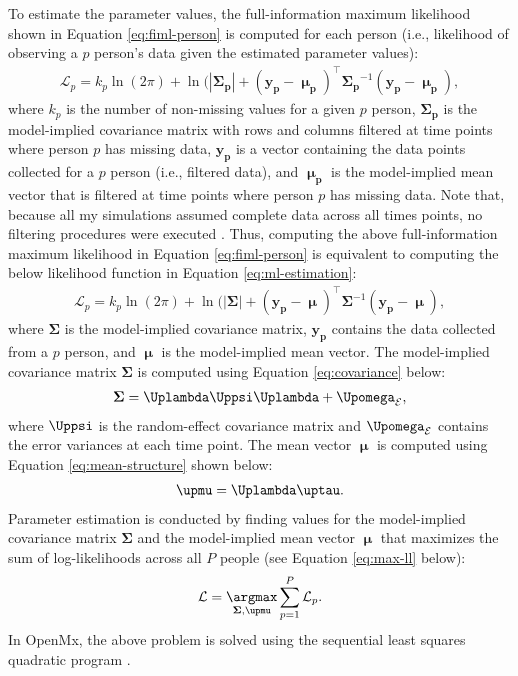 \documentclass[
12pt, %
twoside,
english]{guelphthesis}
\begin{document}
To estimate the parameter values, the full-information maximum
likelihood shown in Equation \ref{eq:fiml-person} is computed for each
person (i.e., likelihood of observing a \(p\) person's data given the
estimated parameter values):
\begin{align}
\mathcal{L}_p = k_p \ln(2\pi) + \ln(|\mathbf{\Sigma_p}| + (\mathbf{y_p} - \mathbf{\upmu_p})^\top \mathbf{\Sigma_p}^{-1}(\mathbf{y_p} - \mathbf{\upmu_p}),
\label{eq:fiml-person}
\end{align}
\noindent where \(k_p\) is the number of non-missing values for a given
\(p\) person, \(\mathbf{\Sigma_p}\) is the model-implied covariance matrix
with rows and columns filtered at time points where person \(p\) has
missing data, \(\mathbf{y_p}\) is a vector containing the data points collected for a \(p\) person (i.e., filtered data), and
\(\mathbf{\upmu_p}\) is the model-implied mean vector that is filtered at
time points where person \(p\) has missing data. Note that, because all
my simulations assumed complete data across all times points, no filtering
procedures were executed \autocite[for a review of the filtering procedure, see][Chapter 5]{boker2020}. Thus, computing the above full-information
maximum likelihood in Equation \ref{eq:fiml-person} is equivalent to
computing the below likelihood function in Equation
\ref{eq:ml-estimation}:
\begin{align}
\mathcal{L}_p = k_p \ln(2\pi) + \ln(|\mathbf{\Sigma}| + (\mathbf{y_p} - \mathbf{\upmu})^\top \mathbf{\Sigma}^{-1}(\mathbf{y_p} - \mathbf{\upmu}),  
\label{eq:ml-estimation}
\end{align}
\noindent where \(\mathbf{\Sigma}\) is the model-implied covariance matrix,
\(\mathbf{y_p}\) contains the data collected from a \(p\) person, and
\(\mathbf{\upmu}\) is the model-implied mean vector. The model-implied
covariance matrix \(\mathbf{\Sigma}\) is computed using Equation
\ref{eq:covariance} below:
\begin{align}
\mathbf{\Sigma} = \mathbf{\Uplambda\Uppsi\Uplambda} + \mathbf{\Upomega}_{\mathcal{E}},   
\label{eq:covariance}
\end{align}
\noindent where \(\mathbf{\Uppsi}\) is the random-effect covariance matrix
and \(\mathbf{\Upomega}_{\mathcal{E}}\) contains the error variances at
each time point. The mean vector \(\mathbf{\upmu}\) is computed using
Equation \ref{eq:mean-structure} shown below:
\begin{align}
\mathbf{\upmu} = \mathbf{\Uplambda\uptau}. 
\label{eq:mean-structure}
\end{align}
\noindent Parameter estimation is conducted by finding values for the model-implied
covariance matrix \(\mathbf{\Sigma}\) and the model-implied mean vector
\(\mathbf{\upmu}\) that maximizes the sum of log-likelihoods across all \(P\) people
(see Equation \ref{eq:max-ll} below):
\begin{align}
\mathcal{L} = \underset{\mathbf{\Sigma},\mathbf{\upmu} }{\argmax} \sum^P_{p = 1} \mathcal{L}_p.
\label{eq:max-ll}
\end{align}
\noindent In OpenMx, the above problem is solved using the sequential
least squares quadratic program \autocite[for a review, see][]{kraft1994}.
\end{document}
